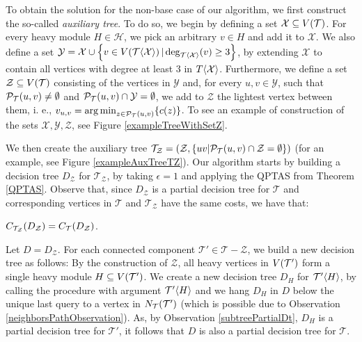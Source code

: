 To obtain the solution for the non-base case of our algorithm, we first construct the so-called \textit{auxiliary tree}. To do so, we begin by defining a set $\mathcal{X}\subseteq V\mathopen{}\left( \mathcal{T} \right)$. For every heavy module $H\in\mathcal{H}$, we pick an arbitrary $v\in H$ and add it to $\mathcal{X}$. We also define a set 
$\mathcal{Y}=\mathcal{X}\cup\mathopen{}\left\{ v\in V\mathopen{}\left( \mathcal{T}\mathopen{}\langle \mathcal{X} \rangle \right) | \deg_{\mathcal{T}\mathopen{}\langle \mathcal{X} \rangle}\mathopen{}\left( v \right)\geq 3 \right\}$, by extending $\mathcal{X}$ to contain all vertices with degree at least $3$ in $T\mathopen{}\langle \mathcal{X} \rangle$. Furthermore, we define a set $\mathcal{Z}\subseteq V\mathopen{}\left( \mathcal{T} \right)$ consisting of the vertices in $\mathcal{Y}$ and, for every $u,v\in \mathcal{Y}$, such that $\mathcal{P}_{\mathcal{T}}\mathopen{}\left( u, v \right)\neq\emptyset$ and $\mathcal{P}_{\mathcal{T}}\mathopen{}\left( u, v \right)\cap \mathcal{Y}=\emptyset$, we add to $\mathcal{Z}$ the lightest vertex between them, i. e., 
$v_{u,v} = \operatorname*{arg\,min}_{z\in \mathcal{P}_{\mathcal{T}}\mathopen{}\left( u, v \right)}\mathopen{}\left\{ c\mathopen{}\left( z \right) \right\}$.
To see an example of construction of the sets $\mathcal{X}, \mathcal{Y}, \mathcal{Z}$, see Figure \ref{exampleTreeWithSetZ}. 

We then create the auxiliary tree 
$\mathcal{T}_{\mathcal{Z}}=\mathopen{}\left( \mathcal{Z},\mathopen{}\left\{ uv | \mathcal{P}_{\mathcal{T}}\mathopen{}\left( u, v \right)\cap \mathcal{Z}=\emptyset \right\} \right)$ 
(for an example, see Figure \ref{exampleAuxTreeTZ}). Our algorithm starts by building a decision tree $D_{\mathcal{Z}}$ for $\mathcal{T}_{\mathcal{Z}}$, by taking $\epsilon=1$ and applying the QPTAS from Theorem \ref{QPTAS}. Observe that, since $D_{\mathcal{Z}}$ is a partial decision tree for $\mathcal{T}$ and corresponding vertices in $\mathcal{T}$ and $\mathcal{T}_{\mathcal{Z}}$ have the same costs, we have that:


\begin{observation}\label{CostDZinTObservation}
    $C_{\mathcal{T}_{\mathcal{Z}}}\mathopen{}\left( D_{\mathcal{Z}} \right)=C_{\mathcal{T}}\mathopen{}\left( D_{\mathcal{Z}} \right)$.
\end{observation}


Let $D = D_{\mathcal{Z}}$. For each connected component $\mathcal{T}'\in \mathcal{T}-\mathcal{Z}$, we build a new decision tree as follows: By the construction of $\mathcal{Z}$, all heavy vertices in $V\mathopen{}\left( \mathcal{T}' \right)$ form a single heavy module $H\subseteq V\mathopen{}\left( \mathcal{T}' \right)$. We create a new decision tree $D_H$ for $\mathcal{T}'\mathopen{}\langle H \rangle$, by calling the \FRankingBasedDT procedure with argument $\mathcal{T}'\mathopen{}\langle H \rangle$ and we hang $D_{H}$ in $D$ below the unique last query to a vertex in $N_\mathcal{T}\mathopen{}\left( \mathcal{T}' \right)$ (which is possible due to Observation \ref{neighborsPathObservation}). As, by Observation \ref{subtreePartialDt}, $D_H$ is a partial decision tree for $\mathcal{T}'$, it follows that $D$ is also a partial decision tree for $\mathcal{T}$. 

